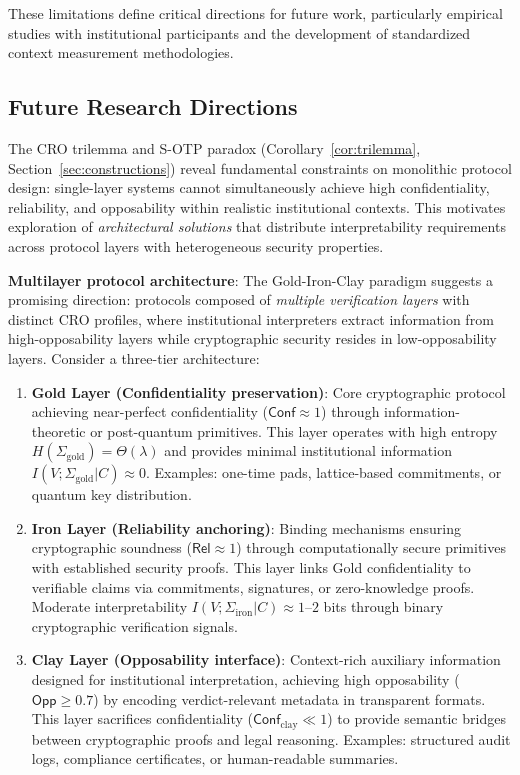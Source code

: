\documentclass{ieeeaccess}
\begin{document}
These limitations define critical directions for future work, particularly empirical studies with institutional participants and the development of standardized context measurement methodologies.

\subsection{Future Research Directions}\label{subsec:future_directions}

The CRO trilemma and S-OTP paradox (Corollary~\ref{cor:trilemma}, Section~\ref{sec:constructions}) reveal fundamental constraints on monolithic protocol design: single-layer systems cannot simultaneously achieve high confidentiality, reliability, and opposability within realistic institutional contexts. This motivates exploration of \emph{architectural solutions} that distribute interpretability requirements across protocol layers with heterogeneous security properties.

\textbf{Multilayer protocol architecture}: The Gold-Iron-Clay paradigm suggests a promising direction: protocols composed of \emph{multiple verification layers} with distinct CRO profiles, where institutional interpreters extract information from high-opposability layers while cryptographic security resides in low-opposability layers. Consider a three-tier architecture:

\begin{enumerate}
\item \textbf{Gold Layer (Confidentiality preservation)}: Core cryptographic protocol achieving near-perfect confidentiality ($\mathsf{Conf} \approx 1$) through information-theoretic or post-quantum primitives. This layer operates with high entropy $H(\Sigma_{\text{gold}}) = \Theta(\lambda)$ and provides minimal institutional information $I(V;\Sigma_{\text{gold}}|C) \approx 0$. Examples: one-time pads, lattice-based commitments, or quantum key distribution.

\item \textbf{Iron Layer (Reliability anchoring)}: Binding mechanisms ensuring cryptographic soundness ($\mathsf{Rel} \approx 1$) through computationally secure primitives with established security proofs. This layer links Gold confidentiality to verifiable claims via commitments, signatures, or zero-knowledge proofs. Moderate interpretability $I(V;\Sigma_{\text{iron}}|C) \approx 1$--$2$ bits through binary cryptographic verification signals.

\item \textbf{Clay Layer (Opposability interface)}: Context-rich auxiliary information designed for institutional interpretation, achieving high opposability ($\mathsf{Opp} \geq 0.7$) by encoding verdict-relevant metadata in transparent formats. This layer sacrifices confidentiality ($\mathsf{Conf}_{\text{clay}} \ll 1$) to provide semantic bridges between cryptographic proofs and legal reasoning. Examples: structured audit logs, compliance certificates, or human-readable summaries.
\end{enumerate}
\end{document}
